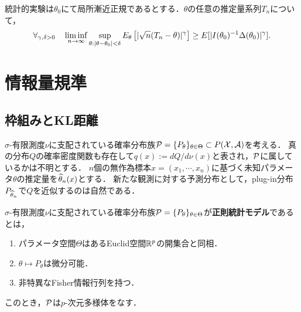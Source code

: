\documentclass[uplatex,dvipdfmx]{jsreport}
\begin{document}
\begin{theorem}[Hajekの不等式]
    統計的実験は$\theta_0$にて局所漸近正規であるとする．$\theta$の任意の推定量系列$T_n$について，
    \[\forall_{\gamma,\delta>0}\quad\liminf_{n\to\infty}\sup_{\theta:\abs{\theta-\theta_0}<\delta}E_\theta\Square{\abs{\sqrt{n}(T_n-\theta)}^\gamma}\ge E[\abs{I(\theta_0)^{-1}\Delta(\theta_0)}^\gamma].\]
\end{theorem}

\section{情報量規準}

\subsection{枠組みとKL距離}

\begin{notation}
    $\sigma$-有限測度$\nu$に支配されている確率分布族$\P=\{P_\theta\}_{\theta\in\Theta}\subset P(\X,\A)$を考える．
    真の分布$Q$の確率密度関数も存在して$q(x):=dQ/d\nu(x)$と表され，$\P$に属しているかは不明とする．
    $n$個の無作為標本$x=(x_1,\cdots,x_n)$に基づく未知パラメータ$\theta$の推定量を$\wh{\theta}_n(x)$とする．
    新たな観測に対する予測分布として，plug-in分布$P_{\wh{\theta}_n}$で$Q$を近似するのは自然である．
\end{notation}

\begin{definition}
    $\sigma$-有限測度$\nu$に支配されている確率分布族$\P=\{P_\theta\}_{\theta\in\Theta}$が\textbf{正則統計モデル}であるとは，
    \begin{enumerate}
        \item パラメータ空間$\Theta$はあるEuclid空間$\R^p$の開集合と同相．
        \item $\theta\mapsto P_\theta$は微分可能．
        \item 非特異なFisher情報行列を持つ．
    \end{enumerate}
    このとき，$\P$は$p$-次元多様体をなす．
\end{definition}
\end{document}
